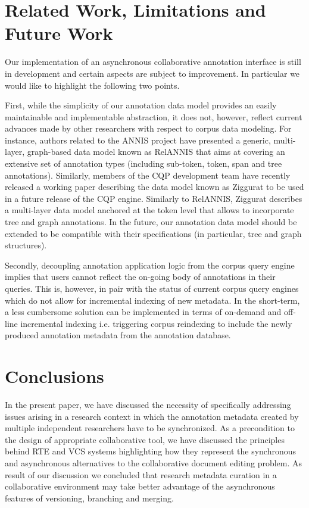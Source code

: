 \documentclass{sig-alternate}
\begin{document}
\section{Related Work, Limitations and Future Work}

Our implementation of an asynchronous collaborative annotation interface is still in development
and certain aspects are subject to improvement. In particular we would like to highlight the
following two points.

First, while the simplicity of our annotation data model provides an easily maintainable and
implementable abstraction, it does not, however, reflect current advances made by other researchers
with respect to corpus data modeling. For instance, authors related to the ANNIS project have
presented a generic, multi-layer, graph-based data model known as RelANNIS \cite{Krause2016} that
aims at covering an extensive set of annotation types (including sub-token, token, span and
tree annotations). Similarly, members of the CQP development team have recently released a working
paper describing the data model \textemdash known as Ziggurat \cite{Evert2015} \textemdash to be
used in a future release of the CQP engine. Similarly to RelANNIS, Ziggurat describes a multi-layer
data model anchored at the token level that allows to incorporate tree and graph annotations.
In the future, our annotation data model should be extended to be compatible with their
specifications (in particular, tree and graph structures).

Secondly, decoupling annotation application logic from the corpus query engine implies that
users cannot reflect the on-going body of annotations in their queries. This is, however, in
pair with the status of current corpus query engines which do not allow for incremental indexing of
new metadata. In the short-term, a less cumbersome solution can be implemented in terms of
on-demand and off-line incremental indexing \textemdash i.e. triggering corpus reindexing
to include the newly produced annotation metadata from the annotation database.

\section{Conclusions}\label{sec:conclusion}
In the present paper, we have discussed the necessity of specifically addressing issues arising
in a research context in which the annotation metadata created by multiple independent researchers
have to be synchronized. 
As a precondition to the design of appropriate collaborative tool, we have discussed the principles
behind RTE and VCS systems highlighting how they represent the synchronous and asynchronous
alternatives to the collaborative document editing problem. As result of our discussion
we concluded that research metadata curation in a collaborative environment may take better
advantage of the asynchronous features of versioning, branching and merging.
\end{document}
